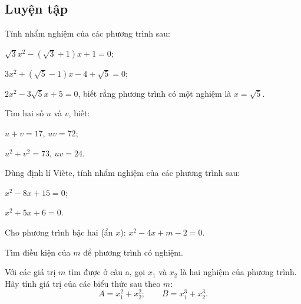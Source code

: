 \begin{practice}
    \subsection{Luyện tập}

    \begin{questions}[resume=SBT]
        \item Tính nhẩm nghiệm của các phương trình sau:
        \begin{questions}
            \item $\sqrt{3}x^2-(\sqrt{3}+1)x+1=0$;
            \item $3x^2+(\sqrt{5}-1)x-4+\sqrt{5}=0$;
            \item $2x^2-3\sqrt{5}x+5=0$, biết rằng phương trình có một nghiệm là $x=\sqrt{5}$.
        \end{questions}

        \answerline
        \answerline

        \item Tìm hai số $u$ và $v$, biết:
        \begin{questions}
            \item $u+v=17$, $uv=72$;
            \item $u^2+v^2=73$, $uv=24$.
        \end{questions}

        \answerline
        \answerline

        \item Dùng định lí Viète, tính nhẩm nghiệm của các phương trình sau:
        \begin{questions}
            \item $x^2-8x+15=0$;
            \item $x^2+5x+6=0$.
        \end{questions}

        \answerline

        \item Cho phương trình bậc hai (ẩn $x$): $x^2-4x+m-2=0$.
        \begin{questions}
            \item Tìm điều kiện của $m$ để phương trình có nghiệm.
            \item Với các giá trị $m$ tìm được ở câu a, gọi $x_1$ và $x_2$ là hai nghiệm của phương trình. Hãy tính giá trị của các biểu thức sau theo $m$:
            \[
                A=x_1^2+x_2^2;\qquad B=x_1^3+x_2^3.
            \]
        \end{questions}


\end{questions}
\end{practice}
